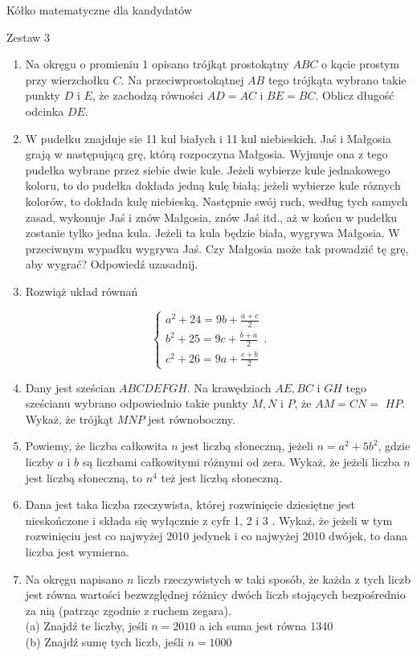 \documentclass[10pt]{article}
\begin{document}
Kółko matematyczne dla kandydatów

Zestaw 3

\begin{enumerate}
  \item Na okręgu o promieniu 1 opisano trójkąt prostokątny \(A B C\) o kącie prostym przy wierzchołku \(C\). Na przeciwprostokątnej \(A B\) tego trójkąta wybrano takie punkty \(D\) i \(E\), że zachodzą równości \(A D=A C\) i \(B E=B C\). Oblicz długość odcinka \(D E\).
  \item W pudełku znajduje sie 11 kul białych i 11 kul niebieskich. Jaś i Małgosia grają w następującą grę, którą rozpoczyna Małgosia. Wyjmuje ona z tego pudełka wybrane przez siebie dwie kule. Jeżeli wybierze kule jednakowego koloru, to do pudełka dokłada jedną kulę białą; jeżeli wybierze kule róznych kolorów, to dokłada kulę niebieską. Następnie swój ruch, według tych samych zasad, wykonuje Jaś i znów Małgosia, znów Jaś itd., aż w końcu w pudełku zostanie tylko jedna kula. Jeżeli ta kula będzie biała, wygrywa Małgosia. W przeciwnym wypadku wygrywa Jaś. Czy Małgosia może tak prowadzić tę grę, aby wygrać? Odpowiedź uzasadnij.
  \item Rozwiąż układ równań
\end{enumerate}

\[
\left\{\begin{array}{l}
a^{2}+24=9 b+\frac{a+c}{2} \\
b^{2}+25=9 c+\frac{b+a}{2} \\
c^{2}+26=9 a+\frac{c+b}{2}
\end{array} .\right.
\]

\begin{enumerate}
  \setcounter{enumi}{3}
  \item Dany jest sześcian \(A B C D E F G H\). Na krawędziach \(A E, B C\) i \(G H\) tego sześcianu wybrano odpowiednio takie punkty \(M, N\) i \(P\), że \(A M=C N=\) \(H P\). Wykaż, że trójkąt \(M N P\) jest równoboczny.
  \item Powiemy, że liczba całkowita \(n\) jest liczbą słoneczną, jeżeli \(n=a^{2}+5 b^{2}\), gdzie liczby \(a\) i \(b\) są liczbami całkowitymi różnymi od zera. Wykaż, że jeżeli liczba \(n\) jest liczbą słoneczną, to \(n^{4}\) też jest liczbą słoneczną.
  \item Dana jest taka liczba rzeczywista, której rozwinięcie dziesiętne jest nieskończone i składa się wyłącznie z cyfr 1, 2 i 3 . Wykaż, że jeżeli w tym rozwinięciu jest co najwyżej 2010 jedynek i co najwyżej 2010 dwójek, to dana liczba jest wymierna.
  \item Na okręgu napisano \(n\) liczb rzeczywistych w taki sposób, że każda z tych liczb jest równa wartości bezwzględnej różnicy dwóch liczb stojących bezpośrednio za nią (patrząc zgodnie z ruchem zegara).\\
(a) Znajdź te liczby, jeśli \(n=2010\) a ich suma jest równa 1340\\
(b) Znajdź sumę tych liczb, jeśli \(n=1000\)
\end{enumerate}
\end{document}
